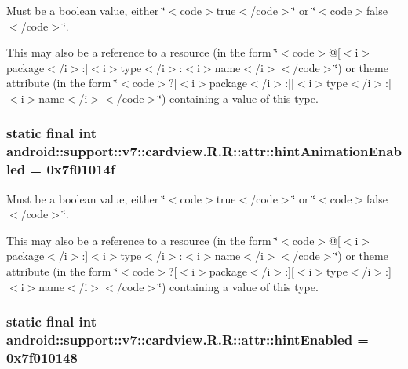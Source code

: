 Must be a boolean value, either \char`\"{}$<$code$>$true$<$/code$>$\char`\"{} or \char`\"{}$<$code$>$false$<$/code$>$\char`\"{}. 

This may also be a reference to a resource (in the form \char`\"{}$<$code$>$@\mbox{[}$<$i$>$package$<$/i$>$:\mbox{]}$<$i$>$type$<$/i$>$:$<$i$>$name$<$/i$>$$<$/code$>$\char`\"{}) or theme attribute (in the form \char`\"{}$<$code$>$?\mbox{[}$<$i$>$package$<$/i$>$:\mbox{]}\mbox{[}$<$i$>$type$<$/i$>$:\mbox{]}$<$i$>$name$<$/i$>$$<$/code$>$\char`\"{}) containing a value of this type. \hypertarget{classandroid_1_1support_1_1v7_1_1cardview_1_1_r_1_1attr_74101dcc5aa4421c9180b320b01d05e8}{
\subsubsection[{hintAnimationEnabled}]{\setlength{\rightskip}{0pt plus 5cm}static final int android::support::v7::cardview.R.R::attr::hintAnimationEnabled = 0x7f01014f}}
\label{classandroid_1_1support_1_1v7_1_1cardview_1_1_r_1_1attr_74101dcc5aa4421c9180b320b01d05e8}


Must be a boolean value, either \char`\"{}$<$code$>$true$<$/code$>$\char`\"{} or \char`\"{}$<$code$>$false$<$/code$>$\char`\"{}. 

This may also be a reference to a resource (in the form \char`\"{}$<$code$>$@\mbox{[}$<$i$>$package$<$/i$>$:\mbox{]}$<$i$>$type$<$/i$>$:$<$i$>$name$<$/i$>$$<$/code$>$\char`\"{}) or theme attribute (in the form \char`\"{}$<$code$>$?\mbox{[}$<$i$>$package$<$/i$>$:\mbox{]}\mbox{[}$<$i$>$type$<$/i$>$:\mbox{]}$<$i$>$name$<$/i$>$$<$/code$>$\char`\"{}) containing a value of this type. \hypertarget{classandroid_1_1support_1_1v7_1_1cardview_1_1_r_1_1attr_5c0eb356a8bc9a4dcb5c7cd15bf671e0}{
\subsubsection[{hintEnabled}]{\setlength{\rightskip}{0pt plus 5cm}static final int android::support::v7::cardview.R.R::attr::hintEnabled = 0x7f010148}}
\label{classandroid_1_1support_1_1v7_1_1cardview_1_1_r_1_1attr_5c0eb356a8bc9a4dcb5c7cd15bf671e0}



